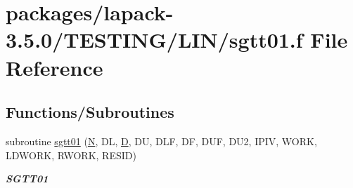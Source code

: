 \hypertarget{sgtt01_8f}{}\section{packages/lapack-\/3.5.0/\+T\+E\+S\+T\+I\+N\+G/\+L\+I\+N/sgtt01.f File Reference}
\label{sgtt01_8f}
\subsection*{Functions/\+Subroutines}
\begin{DoxyCompactItemize}
\item 
subroutine \hyperlink{group__single__lin_gad49bd4e74626aa703bf65ec37293f73a}{sgtt01} (\hyperlink{polmisc_8c_a0240ac851181b84ac374872dc5434ee4}{N}, D\+L, \hyperlink{odrpack_8h_a7dae6ea403d00f3687f24a874e67d139}{D}, D\+U, D\+L\+F, D\+F, D\+U\+F, D\+U2, I\+P\+I\+V, W\+O\+R\+K, L\+D\+W\+O\+R\+K, R\+W\+O\+R\+K, R\+E\+S\+I\+D)
\begin{DoxyCompactList}\small\item\em {\bfseries S\+G\+T\+T01} \end{DoxyCompactList}\end{DoxyCompactItemize}
